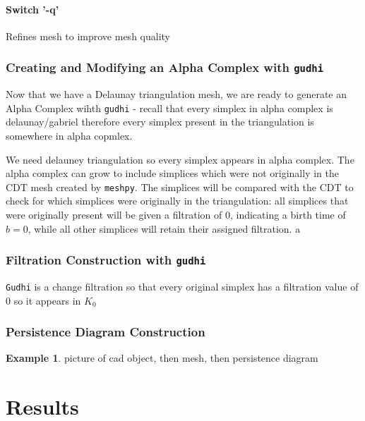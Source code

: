 \documentclass[ma]{uncgdissertationexp}
\theoremstyle{plain}
\theoremstyle{definition}
\newtheorem{example}[theorem]{Example}
\theoremstyle{remark}
\begin{document}
\subsubsection{Switch '-q'}
Refines mesh to improve mesh quality

\cprotect\subsection{Creating and Modifying an Alpha Complex with \verb+gudhi+}
\par Now that we have a Delaunay triangulation mesh, we are ready to generate an Alpha Complex wihth \verb"gudhi"  - recall that every simplex in alpha complex is delaunay/gabriel therefore every simplex present in the triangulation is somewhere in alpha copmlex.
\par We need delauney triangulation so every simplex appears in alpha complex. The alpha complex can grow to include simplices which were not originally in the CDT mesh created by \verb"meshpy". The simplices will be compared with the CDT to check for which simplices were originally in the triangulation: all simplices that were originally present will be given a filtration of 0, indicating a birth time of $b=0$, while all other simplices will retain their assigned filtration.
a
\cprotect\subsection{Filtration Construction with \verb+gudhi+}
\par \verb"Gudhi" is a
change filtration so that every original simplex has a filtration value of 0 so it appears in $K_{0}$

\subsection{Persistence Diagram Construction}
\par 

\begin{example}
picture of cad object, then mesh, then persistence diagram
\end{example}

\chapter{Results}
\end{document}
